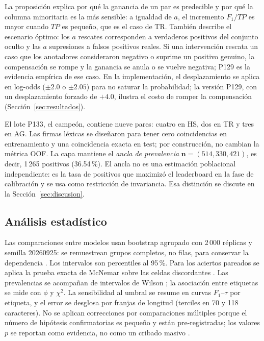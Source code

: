 La proposición explica por qué la ganancia de un par es predecible y por qué
la columna minoritaria es la más sensible: a igualdad de $a$, el incremento
$F_1/TP$ es mayor cuando $TP$ es pequeño, que es el caso de TR. También
describe el escenario óptimo: los $a$ rescates corresponden a verdaderos
positivos del conjunto oculto y las $a$ supresiones a falsos positivos reales.
Si una intervención rescata un caso que los anotadores consideraron negativo o
suprime un positivo genuino, la compensación se rompe y la ganancia se anula o
se vuelve negativa; P129 es la evidencia empírica de ese caso. En la implementación, el desplazamiento se aplica en log-odds
($\pm 2.0$ o $\pm 2.05$) para no saturar la probabilidad; la versión P129,
con un desplazamiento forzado de $+4.0$, ilustra el costo de romper la
compensación (Sección~\ref{sec:resultados}).

El lote P133, el campeón, contiene nueve pares: cuatro en HS, dos en TR y
tres en AG. Las firmas léxicas se diseñaron para tener cero coincidencias en
entrenamiento y una coincidencia exacta en test; por construcción, no
cambian la métrica OOF. La capa mantiene el \emph{ancla de prevalencia}
$\mathbf{n}=(514,330,421)$, es decir, 1\,265 positivos (36.54\,\%). El ancla no
es una estimación poblacional independiente: es la tasa de positivos que
maximizó el leaderboard en la fase de calibración y se usa como restricción
de invariancia. Esa distinción se discute en la Sección~\ref{sec:discusion}.

\subsection{Análisis estadístico}

Las comparaciones entre modelos usan bootstrap agrupado con 2\,000 réplicas y
semilla 20260925: se remuestrean grupos completos, no filas, para conservar
la dependencia \cite{efron1979bootstrap}. Los intervalos son percentiles al
95\,\%. Para los aciertos pareados se aplica la prueba exacta de McNemar
sobre las celdas discordantes \cite{mcnemar1947note,dietterich1998approximate}.
Las prevalencias se acompañan de intervalos de Wilson
\cite{wilson1927probable}; la asociación entre etiquetas se mide con $\phi$ y
$\chi^2$. La sensibilidad al umbral se resume en curvas $F_1$--$\tau$ por
etiqueta, y el error se desglosa por franjas de longitud (terciles en 70 y
118 caracteres). No se aplican correcciones por comparaciones múltiples
porque el número de hipótesis confirmatorias es pequeño y están
pre-registradas; los valores $p$ se reportan como evidencia, no como un
cribado masivo \cite{demsar2006statistical}.

